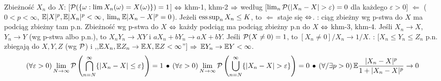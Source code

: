 Zbieżność  $X_n$ do $X$:  [$\operatorname{\mathcal{P}}(\{\omega: \lim X_n(\omega) = X(\omega)\}) = 1$] $\Leftrightarrow$ khm-1, khm-2
$\Rightarrow$ według  [$\lim_n \operatorname{\mathcal{P}} (|X_n-X| > \varepsilon) = 0$ dla każdego $\varepsilon > 0$] $\Leftarrow$  ($0 < p < \infty$, $\mathbb{E} |X|^p, \mathbb{E} |X_n|^p < \infty$, $\lim_n \mathbb{E} |X_n-X|^p = 0$).
Jeżeli $\operatorname{ess\,sup}_{n} X_n \le K$, to $\Leftarrow$ staje się $\Leftrightarrow$.
: ciąg zbieżny wg p-stwa do $X$ ma podciąg zbieżny tam p.n.
Zbieżność wg p-stwa do $X$ $\Leftrightarrow$ każdy podciąg ma podciąg zbieżny p.n do $X$ $\Leftrightarrow$ khm-3, khm-4.
Jeśli $X_n \to X$, $Y_n \to Y$ (wg p-stwa albo p.n.), to $X_n Y_n \to XY$ i $aX_n + bY_n \to aX + bY$.
Jeśli $\operatorname{\mathcal{P}} (X \neq 0) = 1$, to $[X_n \neq 0]/X_n \to 1/X$.
: [$X_n \le Y_n \le Z_n$ p.n. zbiegają do $X,Y,Z$ (wg $\operatorname{\mathcal{P}}$) i ,,$\mathbb{E} X_n, \mathbb{E} Z_n \to \mathbb{E} X, \mathbb{E} Z < \infty$''] $\Rightarrow$  $\mathbb{E} Y_n \to \mathbb{E} Y <\infty$.
\[
 	(\forall \varepsilon > 0) \lim_{N \to \infty} \operatorname{\mathcal{P}} \left(\bigcap_{n=N}^\infty \{|X_n - X| \le \varepsilon\} \right) = 1 \, \bullet \,
 	(\forall \varepsilon > 0) \lim_{N \to \infty} \operatorname{\mathcal{P}} \left(\bigcup_{n=N}^\infty \{|X_n - X| > \varepsilon\} \right) = 0 \, \bullet \,
 	({\forall} / {\exists} p > 0) \, \mathbb{E} \frac{|X_n - X|^p}{1 + |X_n - X|^p} \to 0
 \]